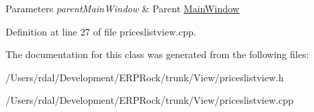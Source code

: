\begin{DoxyParams}{\-Parameters}
{\em parent\-Main\-Window} & \-Parent \hyperlink{class_main_window}{\-Main\-Window} \\
\hline
\end{DoxyParams}


\-Definition at line 27 of file priceslistview.\-cpp.



\-The documentation for this class was generated from the following files\-:\begin{DoxyCompactItemize}
\item 
/\-Users/rdal/\-Development/\-E\-R\-P\-Rock/trunk/\-View/priceslistview.\-h\item 
/\-Users/rdal/\-Development/\-E\-R\-P\-Rock/trunk/\-View/priceslistview.\-cpp\end{DoxyCompactItemize}
